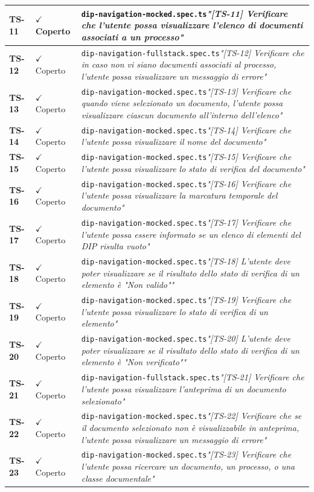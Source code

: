 \documentclass[a4paper,12pt]{article}
\newcommand{\ok}{\textcolor{green!60!black}{$\checkmark$ Coperto}}
\newcommand{\f}[1]{\nolinkurl{#1}\newline}
\newcommand{\q}[1]{\textit{#1}}
\begin{document}
\begin{longtable}{|p{1.5cm}|p{3.0cm}|p{10.5cm}|}
\textbf{TS-11} & \ok & \f{dip-navigation-mocked.spec.ts}\q{"[TS-11] Verificare che l'utente possa visualizzare l'elenco di documenti associati a un processo"} \\ \hline
\textbf{TS-12} & \ok & \f{dip-navigation-fullstack.spec.ts}\q{"[TS-12] Verificare che in caso non vi siano documenti associati al processo, l'utente possa visualizzare un messaggio di errore"} \\ \hline
\textbf{TS-13} & \ok & \f{dip-navigation-mocked.spec.ts}\q{"[TS-13] Verificare che quando viene selezionato un documento, l'utente possa visualizzare ciascun documento all'interno dell'elenco"} \\ \hline
\textbf{TS-14} & \ok & \f{dip-navigation-mocked.spec.ts}\q{"[TS-14] Verificare che l'utente possa visualizzare il nome del documento"} \\ \hline
\textbf{TS-15} & \ok & \f{dip-navigation-mocked.spec.ts}\q{"[TS-15] Verificare che l'utente possa visualizzare lo stato di verifica del documento"} \\ \hline
\textbf{TS-16} & \ok & \f{dip-navigation-mocked.spec.ts}\q{"[TS-16] Verificare che l'utente possa visualizzare la marcatura temporale del documento"} \\ \hline
\textbf{TS-17} & \ok & \f{dip-navigation-mocked.spec.ts}\q{"[TS-17] Verificare che l'utente possa essere informato se un elenco di elementi del DIP risulta vuoto"} \\ \hline
\textbf{TS-18} & \ok & \f{dip-navigation-mocked.spec.ts}\q{"[TS-18] L'utente deve poter visualizzare se il risultato dello stato di verifica di un elemento è "Non valido""} \\ \hline
\textbf{TS-19} & \ok & \f{dip-navigation-mocked.spec.ts}\q{"[TS-19] Verificare che l'utente possa visualizzare lo stato di verifica di un elemento"} \\ \hline
\textbf{TS-20} & \ok & \f{dip-navigation-mocked.spec.ts}\q{"[TS-20] L'utente deve poter visualizzare se il risultato dello stato di verifica di un elemento è "Non verificato""} \\ \hline
\textbf{TS-21} & \ok & \f{dip-navigation-fullstack.spec.ts}\q{"[TS-21] Verificare che l'utente possa visualizzare l'anteprima di un documento selezionato"} \\ \hline
\textbf{TS-22} & \ok & \f{dip-navigation-mocked.spec.ts}\q{"[TS-22] Verificare che se il documento selezionato non è visualizzabile in anteprima, l'utente possa visualizzare un messaggio di errore"} \\ \hline
\textbf{TS-23} & \ok & \f{dip-navigation-mocked.spec.ts}\q{"[TS-23] Verificare che l'utente possa ricercare un documento, un processo, o una classe documentale"} \\ \hline

\end{longtable}
\end{document}
